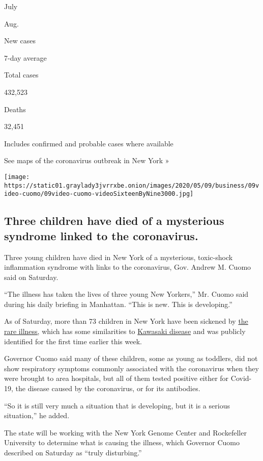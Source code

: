 July

Aug.

New cases

7-day average

Total cases

432,523

Deaths

32,451

Includes confirmed and probable cases where available

See maps of the coronavirus outbreak in New York »

\texttt{[image: https://static01.graylady3jvrrxbe.onion/images/2020/05/09/business/09video-cuomo/09video-cuomo-videoSixteenByNine3000.jpg]}

\hypertarget{three-children-have-died-of-a-mysterious-syndrome-linked-to-the-coronavirus}{%
\subsection{Three children have died of a mysterious syndrome linked to
the
coronavirus.}\label{three-children-have-died-of-a-mysterious-syndrome-linked-to-the-coronavirus}}

Three young children have died in New York of a mysterious, toxic-shock
inflammation syndrome with links to the coronavirus, Gov. Andrew M.
Cuomo said on Saturday.

``The illness has taken the lives of three young New Yorkers,'' Mr.
Cuomo said during his daily briefing in Manhattan. ``This is new. This
is developing.''

As of Saturday, more than 73 children in New York have been sickened by
\href{https://www.nytimes3xbfgragh.onion/article/kawasaki-disease-coronavirus-children.html}{the
rare illness,} which has some similarities to
\href{https://www.cdc.gov/kawasaki/index.html}{Kawasaki disease} and was
publicly identified for the first time earlier this week.

Governor Cuomo said many of these children, some as young as toddlers,
did not show respiratory symptoms commonly associated with the
coronavirus when they were brought to area hospitals, but all of them
tested positive either for Covid-19, the disease caused by the
coronavirus, or for its antibodies.

``So it is still very much a situation that is developing, but it is a
serious situation,'' he added.

The state will be working with the New York Genome Center and
Rockefeller University to determine what is causing the illness, which
Governor Cuomo described on Saturday as ``truly disturbing.''

